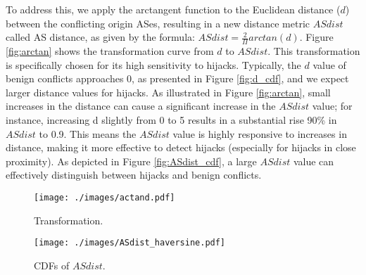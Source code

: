 To address this, we apply the arctangent function to the Euclidean distance ($d$) between the conflicting origin ASes, resulting in a new distance metric $ASdist$ called AS distance, as given by the formula: {$ASdist = \frac{2}{\Pi}arctan(d)$}.
Figure \ref{fig:arctan} shows the transformation curve from $d$ to $ASdist$.
This transformation is specifically chosen for its high sensitivity to hijacks.
Typically, the $d$ value of benign conflicts approaches 0, as presented in Figure \ref{fig:d_cdf}, and we expect larger distance values for hijacks.
As illustrated in Figure \ref{fig:arctan}, small increases in the distance can cause a significant increase in the $ASdist$ value; for instance, increasing d slightly from 0 to 5 results in a substantial rise 90\% in $ASdist$ to 0.9.
This means the $ASdist$ value is highly responsive to increases in distance, making it more effective to detect hijacks (especially for hijacks in close proximity). %
As depicted in Figure \ref{fig:ASdist_cdf}, a large $ASdist$ value can effectively distinguish between hijacks and benign conflicts. %

\begin{figure}[b!]
  \centering

   \begin{minipage}[b]{0.45\linewidth}
    \centering
    \texttt{[image: ./images/actand.pdf]}
    \vspace{-25pt}
    \caption{\small Transformation.}
    \label{fig:arctan}
  \end{minipage}
  \hfill
  \begin{minipage}[b]{0.45\linewidth}
    \centering
    \texttt{[image: ./images/ASdist\_haversine.pdf]}
    \vspace{-25pt}
    \caption{\small CDFs of $ASdist$.}
    \label{fig:ASdist_cdf}
  \end{minipage}
  
  \label{fig:both}
\end{figure}

